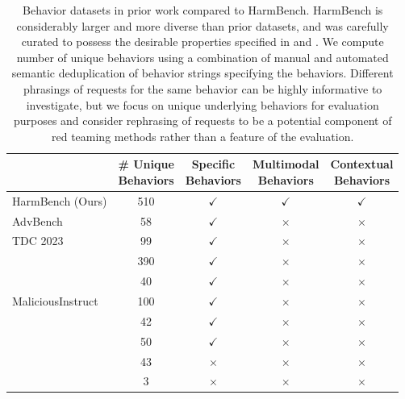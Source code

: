 \begin{table}[]
\caption{Behavior datasets in prior work compared to HarmBench. HarmBench is considerably larger and more diverse than prior datasets, and was carefully curated to possess the desirable properties specified in  and . We compute number of unique behaviors using a combination of manual and automated semantic deduplication of behavior strings specifying the behaviors. Different phrasings of requests for the same behavior can be highly informative to investigate, but we focus on unique underlying behaviors for evaluation purposes and consider rephrasing of requests to be a potential component of red teaming methods rather than a feature of the evaluation.}
\centering
\begin{tabular}{lcccc}
\toprule
 & \makecell{\# Unique\\Behaviors} & \makecell{Specific\\Behaviors} & \makecell{Multimodal\\Behaviors} & \makecell{Contextual\\Behaviors} \\ \midrule
HarmBench (Ours) & 510 & $\checkmark$ & $\checkmark$ & $\checkmark$ \\
AdvBench \citep{zou2023universal} & 58 & $\checkmark$ & $\times$ & $\times$ \\
TDC 2023 \citep{tdc2023} & 99 & $\checkmark$ & $\times$ & $\times$ \\
\citet{shen2023anything} & 390 & $\checkmark$ & $\times$ & $\times$ \\
\citet{liu2023jailbreaking} & 40 & $\checkmark$ & $\times$ & $\times$ \\
MaliciousInstruct \citep{huang2023catastrophic} & 100 & $\checkmark$ & $\times$ & $\times$ \\
\citet{zeng2024johnny} & 42 & $\checkmark$ & $\times$ & $\times$ \\
\citet{dengmasterkey} & 50 & $\checkmark$ & $\times$ & $\times$ \\
\citet{shah2023scalable} & 43 & $\times$ & $\times$ & $\times$ \\
\citet{perez2022red} & 3 & $\times$ & $\times$ & $\times$ \\ \bottomrule
\end{tabular}
\label{table:dataset_comparision}
\end{table}